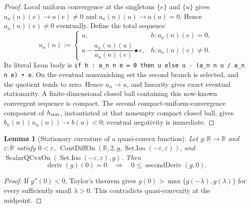 \documentclass[9pt]{extarticle}
\newtheorem{lemma}{Lemma}[section]
\theoremstyle{definition}
\theoremstyle{remark}
\newcommand{\R}{\mathbb R}
\newcommand{\eps}{\varepsilon}
\begin{document}
\begin{proof}
Local uniform convergence at the singletons $\{e\}$ and $\{u\}$ gives
$a_n(n)(e)\to a(e)\neq0$ and $a_n(n)(u)\to a(u)=0$.  Hence
$a_n(n)(e)\neq0$ eventually.  Define the total sequence
\[
 u_n(n):=
 \begin{cases}
  u,&h:a_n(n)(e)=0,\\
  u-\dfrac{a_n(n)(u)}{a_n(n)(e)}\mathbin{\bullet}e,&
    h:a_n(n)(e)\neq0.
 \end{cases}
\]
Its literal Lean body is
\texttt{if h : a\_n n e = 0 then u else
u - (a\_n n u / a\_n n e) • e}.  On the eventual nonvanishing set the
second branch is selected, and the quotient tends to zero.  Hence
$u_n\to u$, and linearity gives exact eventual
stationarity.  A finite-dimensional closed ball containing this now-known
convergent sequence is compact.  The second compact-uniform-convergence
component of $h_{\rm stat}$, instantiated at that nonempty compact closed
ball, gives
$b_n(n)(u_n(n))\to b(u)<0$; eventual negativity is immediate.
\end{proof}

\begin{lemma}[Stationary curvature of a quasi-convex function]
\label{lem:quasiconvex-second}
Let $g:\R\to\R$ and $\eps:\R$ satisfy $0<\eps$,
$\operatorname{ContDiffOn}(\R,2,g,\operatorname{Set.Ioo}(-\eps,\eps))$,
and
$\operatorname{ScalarQCvxOn}(\operatorname{Set.Ioo}(-\eps,\eps),g)$.
Then
\[
 \operatorname{deriv}(g)(0)=0\quad\Longrightarrow\quad
 0\leq\operatorname{secondDeriv}(g,0).
\]
\end{lemma}

\begin{proof}
If $g''(0)<0$, Taylor's theorem gives
$g(0)>\max\{g(-\lambda),g(\lambda)\}$ for every sufficiently small
$\lambda>0$. This contradicts quasi-convexity at the midpoint.
\end{proof}
\end{document}
